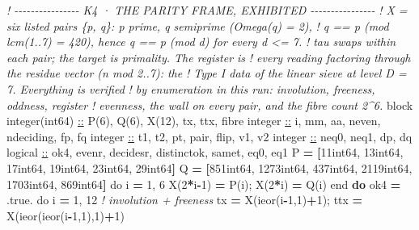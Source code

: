 \documentclass[10pt]{article}
\renewcommand{\_}{\origunderscore\allowbreak}
\newenvironment{Shaded}{}{}
\newcommand{\BuiltInTok}[1]{#1}
\newcommand{\CommentTok}[1]{\textit{#1}}
\newcommand{\ConstantTok}[1]{#1}
\newcommand{\DataTypeTok}[1]{\underline{#1}}
\newcommand{\DecValTok}[1]{#1}
\newcommand{\KeywordTok}[1]{\textbf{#1}}
\newcommand{\NormalTok}[1]{#1}
\begin{document}
\begin{Shaded}
\begin{Highlighting}[]
  \CommentTok{! {-}{-}{-}{-}{-}{-}{-}{-}{-}{-}{-}{-}{-}{-}{-}{-} K4 · THE PARITY FRAME, EXHIBITED {-}{-}{-}{-}{-}{-}{-}{-}{-}{-}{-}{-}{-}{-}{-}{-}}
  \CommentTok{! X = six listed pairs \{p, q\}: p prime, q semiprime (Omega(q) = 2),}
  \CommentTok{! q == p (mod lcm(1..7) = 420), hence q == p (mod d) for every d \textless{}= 7.}
  \CommentTok{! tau swaps within each pair; the target is primality. The register is}
  \CommentTok{! every reading factoring through the residue vector (n mod 2..7): the}
  \CommentTok{! Type I data of the linear sieve at level D = 7. Everything is verified}
  \CommentTok{! by enumeration in this run: involution, freeness, oddness, register}
  \CommentTok{! evenness, the wall on every pair, and the fibre count 2\^{}6.}
\NormalTok{  block}
\BuiltInTok{     i}\NormalTok{nteger(int64) }\DataTypeTok{::}\NormalTok{ P(}\DecValTok{6}\NormalTok{), Q(}\DecValTok{6}\NormalTok{), X(}\DecValTok{12}\NormalTok{), tx, ttx, fibre}
\BuiltInTok{     i}\NormalTok{nteger }\DataTypeTok{::}\NormalTok{ i, mm, aa, n\_even, n\_deciding, fp, fq}
\BuiltInTok{     i}\NormalTok{nteger }\DataTypeTok{::}\NormalTok{ t1, t2, pt, pair, flip, v1, v2}
\BuiltInTok{     i}\NormalTok{nteger }\DataTypeTok{::}\NormalTok{ n\_eq0, n\_eq1, dp, dq}
\BuiltInTok{     l}\NormalTok{ogical }\DataTypeTok{::}\NormalTok{ ok4, even\_r, decides\_r, distinct\_ok, same\_t, eq0, eq1}
\BuiltInTok{     P} \KeywordTok{=} \KeywordTok{[}\DecValTok{11\_int64}\NormalTok{, }\DecValTok{13\_int64}\NormalTok{, }\DecValTok{17\_int64}\NormalTok{, }\DecValTok{19\_int64}\NormalTok{, }\DecValTok{23\_int64}\NormalTok{, }\DecValTok{29\_int64}\KeywordTok{]}
\BuiltInTok{     Q} \KeywordTok{=} \KeywordTok{[}\DecValTok{851\_int64}\NormalTok{, }\DecValTok{1273\_int64}\NormalTok{, }\DecValTok{437\_int64}\NormalTok{, }\DecValTok{2119\_int64}\NormalTok{, }\DecValTok{1703\_int64}\NormalTok{, }\DecValTok{869\_int64}\KeywordTok{]}
\BuiltInTok{     d}\NormalTok{o i }\KeywordTok{=} \DecValTok{1}\NormalTok{, }\DecValTok{6}
\NormalTok{        X(}\DecValTok{2}\KeywordTok{*}\NormalTok{i}\KeywordTok{{-}}\DecValTok{1}\NormalTok{) }\KeywordTok{=}\NormalTok{ P(i); X(}\DecValTok{2}\KeywordTok{*}\NormalTok{i) }\KeywordTok{=}\NormalTok{ Q(i)}
\BuiltInTok{     e}\NormalTok{nd }\KeywordTok{do}
\BuiltInTok{     o}\NormalTok{k4 }\KeywordTok{=} \ConstantTok{.true.}
\BuiltInTok{     d}\NormalTok{o i }\KeywordTok{=} \DecValTok{1}\NormalTok{, }\DecValTok{12}                                  \CommentTok{! involution + freeness}
\NormalTok{        tx }\KeywordTok{=}\NormalTok{ X(}\BuiltInTok{ieor}\NormalTok{(i}\KeywordTok{{-}}\DecValTok{1}\NormalTok{,}\DecValTok{1}\NormalTok{)}\KeywordTok{+}\DecValTok{1}\NormalTok{); ttx }\KeywordTok{=}\NormalTok{ X(}\BuiltInTok{ieor}\NormalTok{(}\BuiltInTok{ieor}\NormalTok{(i}\KeywordTok{{-}}\DecValTok{1}\NormalTok{,}\DecValTok{1}\NormalTok{),}\DecValTok{1}\NormalTok{)}\KeywordTok{+}\DecValTok{1}\NormalTok{)}

\end{Highlighting}
\end{Shaded}
\end{document}
